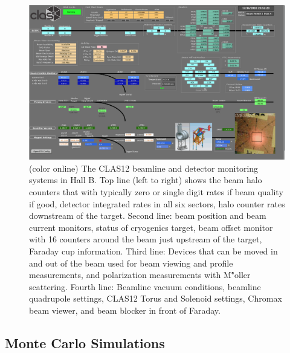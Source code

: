 \documentclass[final,3p,twocolumn]{elsarticle}
\begin{document}
\begin{figure}
\centerline{\includegraphics[width=1.0\columnwidth]{Beam-screen.png}}
\caption{(color online) The CLAS12 beamline and detector monitoring systems in Hall B. 
Top line (left to right) shows the beam halo counters that
with typically zero or single digit rates if beam quality if good, detector integrated rates in all six sectors, halo counter rates downstream of the target. Second line: beam position and beam current monitors, status of cryogenics target, beam 
offset monitor  with 16 counters around the beam just upstream of the target, Faraday cup information. Third line: Devices that can be moved in and out of the beam used for beam viewing and profile measurements, and polarization measurements with M\^"oller scattering.  Fourth line: Beamline vacuum conditions, beamline quadrupole settings, CLAS12 Torus and Solenoid settings, 
Chromax beam viewer, and beam blocker in front of Faraday.} 
\label{beam-monitoring}
\end{figure}


\subsection{Monte Carlo Simulations} 
\end{document}
